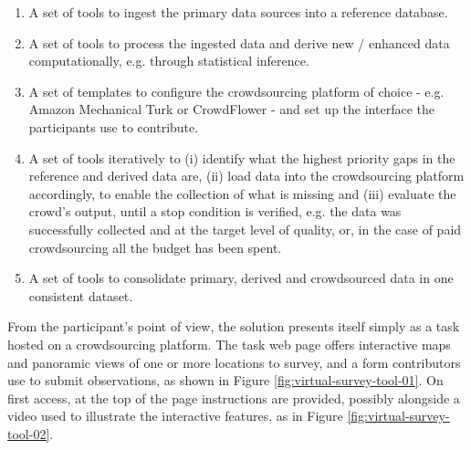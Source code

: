 \begin{enumerate}
    \item A set of tools to ingest the primary data sources into a reference database.
    \item A set of tools to process the ingested data and derive new / enhanced data computationally, e.g. through statistical inference.
    \item A set of templates to configure the crowdsourcing platform of choice - e.g. Amazon Mechanical Turk or CrowdFlower - and set up the interface the participants use to contribute.
    \item A set of tools iteratively to (i) identify what the highest priority gaps in the reference and derived data are, (ii) load data into the crowdsourcing platform accordingly, to enable the collection of what is missing and (iii) evaluate the crowd's output, until a stop condition is verified, e.g. the data was successfully collected and at the target level of quality, or, in the case of paid crowdsourcing all the budget has been spent.
    \item A set of tools to consolidate primary, derived and crowdsourced data in one consistent dataset.
\end{enumerate}

From the participant's point of view, the solution presents itself simply as a task hosted on a crowdsourcing platform. The task web page offers interactive maps and panoramic views of one or more locations to survey, and a form contributors use to submit observations, as shown in Figure \ref{fig:virtual-survey-tool-01}. On first access, at the top of the page instructions are provided, possibly alongside a video used to illustrate the interactive features, as in Figure \ref{fig:virtual-survey-tool-02}.

\begin{figure}[!ht]
    \begin{floatrow}
    \end{floatrow}
\end{figure}

